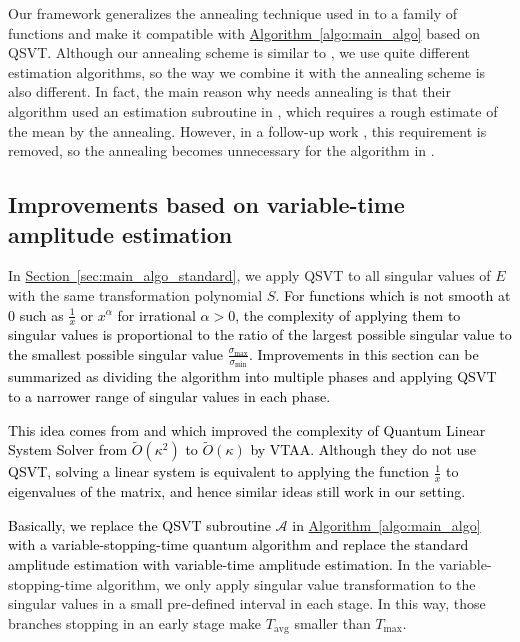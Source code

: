\documentclass[journal]{IEEEtran}
\newcommand{\algo}[1]{\hyperref[algo:#1]{Algorithm~\ref*{algo:#1}}}
\renewcommand{\sec}[1]{\hyperref[sec:#1]{Section~\ref*{sec:#1}}}
\begin{document}
Our framework generalizes the annealing technique used in \cite{li2019entropy} to a family of functions and make it compatible with \algo{main_algo} based on QSVT. Although our annealing scheme is similar to \cite{li2019entropy}, we use quite different estimation algorithms, so the way we combine it with the annealing scheme is also different. In fact, the main reason why \cite{li2019entropy} needs annealing is that their algorithm used an estimation subroutine in \cite{hamoudi2019Chebyshev}, which requires a rough estimate of the mean by the annealing. However, in a follow-up work \cite{hamoudi2021quantum}, this requirement is removed, so the annealing  becomes unnecessary for the algorithm in \cite{li2019entropy}.


\subsection{Improvements based on variable-time amplitude estimation}
\label{sec:main_algo_2}\noindent
In \sec{main_algo_standard}, we apply QSVT to all singular values of $E$ with the same transformation polynomial $S$. \textcolor{black}{For functions which is not smooth at $0$ such as $\frac{1}{x}$ or $x^{\alpha}$ for irrational $\alpha >0$, the complexity of applying them to singular values is proportional to the ratio of the largest possible singular value to the smallest possible singular value $\frac{\sigma_{\max}}{\sigma_{\min}}$. Improvements in this section can be summarized as dividing the algorithm into multiple phases and applying QSVT to a narrower range of singular values in each phase.}

\textcolor{black}{This idea comes from \cite{ambainis2012variable} and \cite{childs2017} which improved the complexity of Quantum Linear System Solver from $\tilde{O}(\kappa^2)$ to $\tilde{O}(\kappa)$ by VTAA. Although they do not use QSVT, solving a linear system is equivalent to applying the function $\frac{1}{x}$ to eigenvalues of the matrix, and hence similar ideas still work in our setting.}


\textcolor{black}{Basically, we replace the QSVT subroutine $\mathcal{A}$ in \algo{main_algo} with a variable-stopping-time quantum algorithm and replace the standard amplitude estimation with variable-time amplitude estimation.} In the variable-stopping-time algorithm, we only apply singular value transformation to the singular values in a small pre-defined interval in each stage. In this way, those branches stopping in an early stage make $T_{\mathrm{avg}}$ smaller than $T_{\max}$. 
\end{document}

